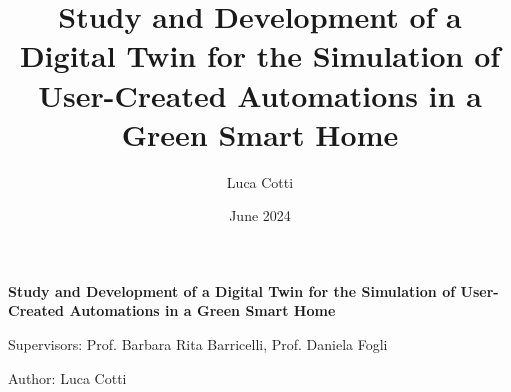 \documentclass[a4paper,12pt]{article} %
\title{Study and Development of a Digital Twin for the Simulation of User-Created Automations in a Green Smart Home}
\author{Luca Cotti}
\date{June 2024}
\begin{document}

\begin{titlepage}
    \begin{center}
        \Large{\textbf{Study and Development of a Digital Twin for the Simulation of User-Created Automations in a Green Smart Home}}\\
        
        \vspace{4mm}
    
        \normalsize{Supervisors: Prof. Barbara Rita Barricelli, Prof. Daniela Fogli}\\
        
        \vspace{4mm}
    
        \normalsize{Author: Luca Cotti}\\
    \end{center}
\end{titlepage}



\printbibliography[heading=bibintoc] %
\end{document}
